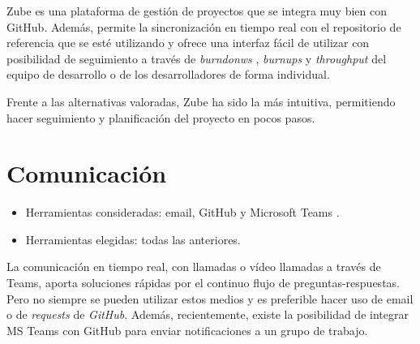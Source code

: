 Zube es una plataforma de gestión de proyectos que se integra muy bien con GitHub. Además,
permite la sincronización en tiempo real con el repositorio de referencia que se esté 
utilizando y ofrece una interfaz fácil de utilizar con posibilidad de seguimiento
a través de \emph{burndonws} , \emph{burnups} y \emph{throughput} del equipo de desarrollo 
o de los desarrolladores de forma individual. 

Frente a las alternativas valoradas, Zube ha sido la más intuitiva,
permitiendo hacer seguimiento y planificación del proyecto en pocos pasos. 


\section{Comunicación}\label{comunicacion}

\begin{itemize}
\tightlist
\item
  Herramientas consideradas: email, GitHub y Microsoft Teams \citep{online:ms_teams}.
\item
  Herramientas elegidas: todas las anteriores. 
\end{itemize}

La comunicación en tiempo real, con llamadas o vídeo llamadas a través de Teams, 
 aporta soluciones rápidas por el continuo flujo de preguntas-respuestas. Pero no 
 siempre se pueden utilizar estos medios y es preferible hacer uso de email 
 o de \emph{requests} de \emph{GitHub}. Además, recientemente, existe la posibilidad
 de integrar MS Teams con GitHub \citep{online:integrar_teams_github} para enviar notificaciones 
 a un grupo de trabajo. 
